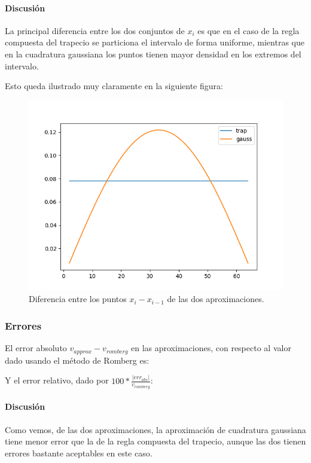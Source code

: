 \paragraph{Discusión} 
La principal diferencia entre los dos conjuntos de $x_i$ es que en el caso de la regla compuesta del trapecio se particiona el intervalo de forma uniforme, mientras que en la cuadratura gaussiana los puntos tienen mayor densidad en los extremos del intervalo.

Esto queda ilustrado muy claramente en la siguiente figura:
\begin{figure}[h!]
	\centering
	\includegraphics[width=0.8\linewidth]{figures/gauss_trap_diff_xi.png}
	\caption{Diferencia entre los puntos $x_i - x_{i-1}$ de las dos aproximaciones.}
	\label{fig:gauss_trap_diff_xi}
\end{figure}

\subsubsection{Errores}

El error absoluto $v_{approx} - v_{romberg}$ en las aproximaciones, con respecto al valor dado usando el método de Romberg es: 

\begin{table}[H]
\end{table}

Y el error relativo, dado por $ 100 * \frac{|err_{abs}|}{v_{romberg}}$: 
\begin{table}[H]
\end{table}

\paragraph{Discusión}
Como vemos, de las dos aproximaciones, la aproximación de cuadratura gaussiana tiene menor error que la de la regla compuesta del trapecio, aunque las dos tienen errores bastante aceptables en este caso.